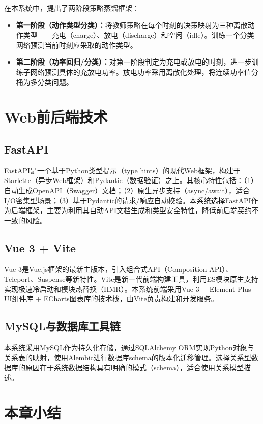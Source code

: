 \documentclass[12pt,a4paper]{ctexbook}
\begin{document}
在本系统中，提出了两阶段策略蒸馏框架：
\begin{itemize}
  \item \textbf{第一阶段（动作类型分类）：}将教师策略在每个时刻的决策映射为三种离散动作类型——充电（charge）、放电（discharge）和空闲（idle）。训练一个分类网络预测当前时刻应采取的动作类型。
  \item \textbf{第二阶段（功率回归/分类）：}对第一阶段判定为充电或放电的时刻，进一步训练子网络预测具体的充放电功率。放电功率采用离散化处理，将连续功率值分桶为多分类问题。
\end{itemize}

\section{Web前后端技术}

\subsection{FastAPI}

FastAPI是一个基于Python类型提示（type hints）的现代Web框架，构建于Starlette（异步Web框架）和Pydantic（数据验证）之上\cite{fastapi}。其核心特性包括：（1）自动生成OpenAPI（Swagger）文档；（2）原生异步支持（async/await），适合I/O密集型场景；（3）基于Pydantic的请求/响应自动校验。本系统选择FastAPI作为后端框架，主要为利用其自动API文档生成和类型安全特性，降低前后端契约不一致的风险。

\subsection{Vue 3 + Vite}

Vue 3是Vue.js框架的最新主版本，引入组合式API（Composition API）、Teleport、Suspense等新特性\cite{vue3}。Vite是新一代前端构建工具，利用ES模块原生支持实现极速冷启动和模块热替换（HMR）。本系统前端采用Vue 3 + Element Plus UI组件库 + ECharts图表库的技术栈，由Vite负责构建和开发服务。

\subsection{MySQL与数据库工具链}

本系统采用MySQL作为持久化存储，通过SQLAlchemy ORM实现Python对象与关系表的映射，使用Alembic进行数据库schema的版本化迁移管理。选择关系型数据库的原因在于系统数据结构具有明确的模式（schema），适合使用关系模型描述。

\section{本章小结}
\end{document}
